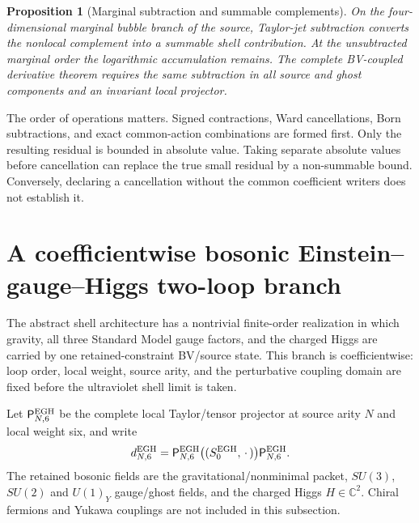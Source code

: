 \documentclass[11pt,a4paper,oneside]{book}
\theoremstyle{plain}
\newtheorem{proposition}[theorem]{Proposition}
\theoremstyle{definition}
\theoremstyle{remark}
\newcommand{\C}{\mathbb C}
\begin{document}
\begin{proposition}[Marginal subtraction and summable complements]
On the four-dimensional marginal bubble branch of the source, Taylor-jet subtraction converts the nonlocal complement into a summable shell contribution. At the unsubtracted marginal order the logarithmic accumulation remains. The complete BV-coupled derivative theorem requires the same subtraction in all source and ghost components and an invariant local projector.
\end{proposition}
\cite{R2,R16,R18}

The order of operations matters. Signed contractions, Ward cancellations, Born subtractions, and exact common-action combinations are formed first. Only the resulting residual is bounded in absolute value. Taking separate absolute values before cancellation can replace the true small residual by a non-summable bound. Conversely, declaring a cancellation without the common coefficient writers does not establish it.

\section{A coefficientwise bosonic Einstein--gauge--Higgs two-loop branch}
\label{sec:perturbative-egh}
The abstract shell architecture has a nontrivial finite-order realization in
which gravity, all three Standard Model gauge factors, and the charged Higgs
are carried by one retained-constraint BV/source state.  This branch is
coefficientwise: loop order, local weight, source arity, and the perturbative
coupling domain are fixed before the ultraviolet shell limit is taken.

Let $\mathsf P^{\rm EGH}_{N,6}$ be the complete local Taylor/tensor projector at
source arity $N$ and local weight six, and write
\begin{equation}
 d^{\rm EGH}_{N,6}
 =\mathsf P^{\rm EGH}_{N,6}
   \bigl((S_0^{\rm EGH},\,\cdot\,)\bigr)
   \mathsf P^{\rm EGH}_{N,6}.
 \label{eq:egh-bv-differential}
\end{equation}
The retained bosonic fields are the gravitational/nonminimal packet,
$SU(3)$, $SU(2)$ and $U(1)_Y$ gauge/ghost fields, and the charged Higgs
$H\in\C^2$.  Chiral fermions and Yukawa couplings are not included in this
subsection.
\end{document}
